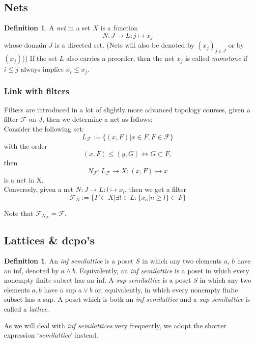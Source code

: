 \documentclass[a4paper,12pt]{article}
\theoremstyle{definition}
\newtheorem{definition}[theorem]{Definition}
\begin{document}
\subsection{Nets}
\begin{definition}
A \emph{net} in a set $X$ is a function
$$N: J \rightarrow L : j \mapsto x_j$$
whose domain $J$ is a directed set. (Nets will also be denoted by $(x_j)_{j\in J}$ or by $(x_j)$)) If the set $L$ also carries a preorder, then the net $x_j$ is called \emph{monotone} if $i \leq j$ always implies $x_i \leq x_j$.
\end{definition}

\subsubsection{Link with filters}
Filters are introduced in a lot of slightly more advanced topology courses, given a filter $\mathcal{F}$ on $J$, then we determine a net as follows:\\
Consider the following set:
$$L_\mathcal{F} := \{(x,F)|x\in F, F\in\mathcal{F}\}$$
with the order
$$(x,F) \leq (y, G) \Leftrightarrow G \subset F,$$
then
$$N_\mathcal{F}: L_\mathcal{F} \rightarrow X: (x, F) \mapsto x$$
is a net in X.\\

Conversely, given a net $N: J \rightarrow L: l \mapsto x_l$, then we get a filter
$$\mathcal{F}_N := \{F \subset X | \exists l \in L: \{x_n | n \geq l\} \subset F\} $$

Note that $\mathcal{F}_{N_\mathcal{F}} = \mathcal{F}.$

\subsection{Lattices \& dcpo's}
\begin{definition}
An \emph{inf semilattice} is a poset $S$ in which any two elements $a$, $b$ have an inf, denoted by $a \wedge b$. Equivalently, an \emph{inf semilattice} is a poset in which every nonempty finite subset has an inf. A \emph{sup semilattice} is a poset $S$ in which any two elements $a, b$ have a sup $a \vee b$ or, equivalently, in which every nonempty finite subset has a sup. A poset which is both an \emph{inf semilattice} and a \emph{sup semilattice} is called a \emph{lattice}.
\end{definition}

As we will deal with \emph{inf semilattices} very frequently, we adopt the shorter expression `\emph{semilattice}' instead.
\end{document}
